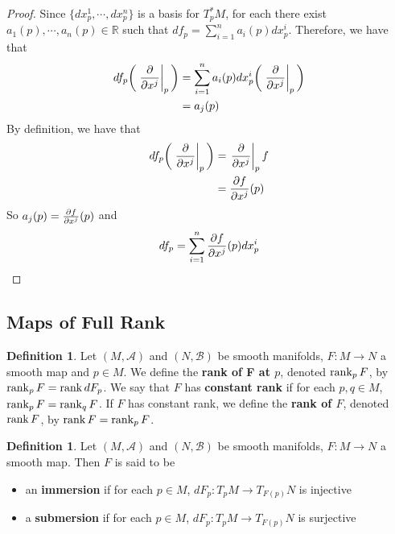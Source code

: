 \documentclass[12pt]{amsart}
\theoremstyle{definition}
\newtheorem{defn}[definition]{Definition}
\newcommand{\R}{\mathbb{R}}
\newcommand{\MA}{\mathcal{A}}
\newcommand{\MB}{\mathcal{B}}
\begin{document}
	\begin{proof}
		 Since $\{dx^1_p, \cdots, dx^n_p\}$ is a basis for $T^*_pM$, for each there exist $a_1(p), \cdots, a_n(p) \in \R$ such that $df_p = \sum\limits_{i=1}^n a_i(p)dx^i_p$. Therefore, we have that 
		\begin{align*}
			df_p \bigg(\eval{\pdv{x^j}}_{p} \bigg) 
			&= \sum\limits_{i=1}^n a_i(p)dx^i_p \bigg(\eval{\pdv{x^j}}_{p} \bigg)  \\
			&=  a_j(p)
		\end{align*}
		By definition, we have that 
		\begin{align*}
			df_p\bigg(\eval{\pdv{x^j}}_{p} \bigg) 
			&= \eval{\pdv{x^j}}_{p} f \\ 
			&= {\pdv{f}{x^j}}(p)\\
		\end{align*}
		So $a_j(p) = {\pdv{f}{x^j}}(p)$ and $$df_p = \sum\limits_{i=1}^n {\pdv{f}{x^j}}(p)dx^i_p$$
	\end{proof}
		
	
	
	
	
	
	
	
	
	
	
	
	
	
	
	
	
	
	
	\newpage
	\subsection{Maps of Full Rank}
	
	\begin{defn}
		Let $(M, \MA)$ and $(N, \MB)$ be smooth manifolds, $F: M \rightarrow N$ a smooth map and $p \in M$. We define the \textbf{rank of F at $p$}, denoted $\rank_p F$, by $\rank_p F = \rank dF_p$. We say that $F$ has \textbf{constant rank} if for each $p, q \in M$, $\rank_p F = \rank_q F$. If $F$ has constant rank, we define the \textbf{rank of $F$}, denoted $\rank F$, by $\rank F = \rank_p F$.
		
	\end{defn}
	
	\begin{defn}
		Let $(M, \MA)$ and $(N, \MB)$ be smooth manifolds, $F: M \rightarrow N$ a smooth map. Then $F$ is said to be 
		\begin{itemize}
		
			\item an \textbf{immersion} if for each $p \in M$, $dF_p:T_pM\rightarrow T_{F(p)}N$ is injective
			\item a \textbf{submersion} if for each $p \in M$, $dF_p:T_pM\rightarrow T_{F(p)}N$ is surjective
		\end{itemize}
	\end{defn}
	
\end{document}
